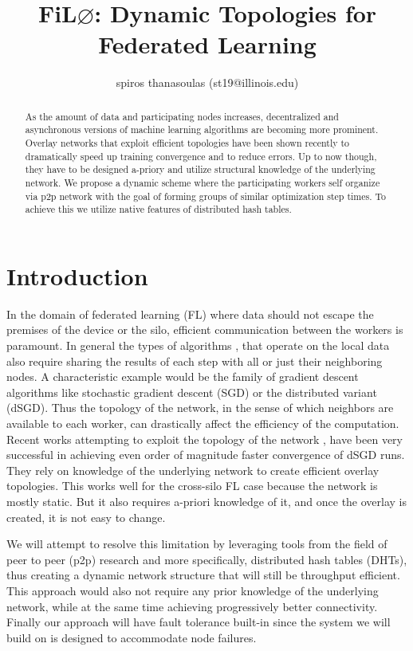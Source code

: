 \documentclass[12pt,notitlepage]{article}
\title{FiL$\varnothing$: Dynamic Topologies for Federated Learning}
\author{spiros thanasoulas (st19@illinois.edu)}
\begin{document}
\maketitle
\begin{abstract}
As the amount of data and participating nodes increases, decentralized and 
asynchronous versions of machine learning algorithms are becoming more 
prominent. Overlay networks that exploit efficient topologies have been 
shown recently to dramatically speed up training convergence and to reduce 
errors.  Up to now though, they have to be designed a-priory and utilize 
structural knowledge of the underlying network. We propose a dynamic scheme 
where the participating workers self organize via p2p network with the goal
of forming groups of similar optimization step times. To achieve this we utilize
native features of distributed hash tables.
\end{abstract}
\section{Introduction}
In the domain of federated learning (FL) where data should not escape the
premises of the device or the silo, efficient communication between the workers
is paramount. In general the types of algorithms 
\cite{towardsFL}, 
\cite{DecentralizedFederatedMultitaskLearning} that operate on the local data 
also require sharing the results of each step with all or just their 
neighboring nodes. A characteristic example would be the family of gradient 
descent algorithms like stochastic gradient descent (SGD) or the distributed
variant (dSGD). Thus the topology of the network, in the sense of which
neighbors are available to each worker, can drastically affect the
efficiency of the computation. Recent works attempting to exploit the topology
of the network \cite{marfoq2020throughputoptimal}, \cite{matcha} 
have been very successful in achieving even order of magnitude faster 
convergence of dSGD runs. They rely on knowledge of the underlying network to
create efficient overlay topologies. This works well for the cross-silo 
FL case because the network is mostly static. But it also 
requires a-priori knowledge of it, and once the overlay is created, it is not
easy to change.

We will attempt to resolve this limitation by leveraging tools from the field
of peer to peer (p2p) research  and more specifically, distributed hash tables 
(DHTs), thus creating a dynamic network structure that will still be throughput
efficient. This approach would also not require any prior knowledge of the 
underlying network, while at the same time achieving progressively better 
connectivity. Finally our approach will have fault tolerance built-in since
the system we will build on is designed to accommodate node failures.
\end{document}
